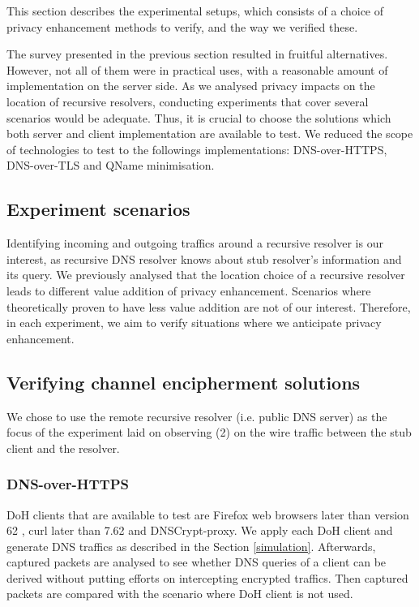 This section describes the experimental setups, which consists of a choice of privacy enhancement methods to verify, and the way we verified these.

The survey presented in the previous section resulted in fruitful alternatives.
However, not all of them were in practical uses, with a reasonable amount of implementation on the server side.
As we analysed privacy impacts on the location of recursive resolvers, conducting experiments that cover several scenarios would be adequate. Thus, it is crucial to choose the solutions which both server and client implementation are available to test.
We reduced the scope of technologies to test to the followings implementations: DNS-over-HTTPS\cite{rfc8484}, DNS-over-TLS\cite{hu2016specification} and QName minimisation\cite{bortzmeyer2016dns}.

\subsection{Experiment scenarios}
Identifying incoming and outgoing traffics around a recursive resolver is our interest, as recursive DNS resolver knows about stub resolver's information and its query.
We previously analysed that the location choice of a recursive resolver leads to different value addition of privacy enhancement.
Scenarios where theoretically proven to have less value addition are not of our interest.
Therefore, in each experiment, we aim to verify situations where we anticipate privacy enhancement. 

\subsection{Verifying channel encipherment solutions}
We chose to use the remote recursive resolver (i.e. public DNS server) as the focus of the experiment laid on observing (2) on the wire traffic between the stub client and the resolver.

\subsubsection{DNS-over-HTTPS}
DoH clients that are available to test are Firefox web browsers later than version 62 \cite{FirefoxDoH}, curl later than 7.62 \cite{CurlDoH} and DNSCrypt-proxy. We apply each DoH client and generate DNS traffics as described in the Section \ref{simulation}. Afterwards, captured packets are analysed to see whether DNS queries of a client can be derived without putting efforts on intercepting encrypted traffics. Then captured packets are compared with the scenario where DoH client is not used.

